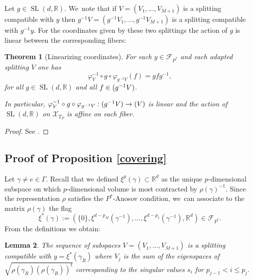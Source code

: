\documentclass[10pt]{amsart}
\newcommand{\NoChangel}[1]{%
\expandafter\let\csname old\string#1\endcsname=#1
\let#1=\relax
\newcommand{#1}{\mathop{\mathcode`l="716C\csname old\string#1\endcsname\mathcode`l="7160}\displaylimits}%
}
\newtheorem{theorem}{Theorem}[section]
\newtheorem{lemma}[theorem]{Lemma}
\newcommand{\R}{\mathbb{R}}
\newcommand{\F}{\mathcal{F}}
\newcommand{\X}{\mathcal{X}}
\let\G\Gamma
\let\g\gamma
\DeclareMathOperator{\nil}{Nil}\NoChangel{\nil}
\DeclareMathOperator{\SL}{SL}
\begin{document}
Let \(g \in \SL (d,\R)\). We~note that if \(V = (V_1,\ldots,V_{M+1})\) is a splitting compatible with \(y\) then \(g^{-1}V = (g^{-1}V_1,\ldots, g^{-1}V_{M+1})\) is a splitting compatible with \(g^{-1}y\).
For the coordinates given by these two splittings the action of \(g\) is linear between the corresponding fibers:

\begin{theorem}[Linearizing coordinates]\label{linearactionlemma}
For each \(y\in \F_{P^\ast} \) and each adapted splitting \(V\) one has
\[
\varphi_{V}^{-1}\circ g \circ \varphi_{g^{-1}V}(f) = g fg^{-1},
\]
for all \(g \in \SL(d,\R)\) and all \(f \in \nil (g^{-1}V)\).

In particular, \(\varphi_{V}^{-1}\circ g\circ \varphi_{g^{-1}V}:\nil(g^{-1}V) \to \nil(V)\) is linear and the action of \(\SL(d,\R) \) on \(\X_{T_P} \) is affine on each fiber.
\end{theorem}
\begin{proof} See \cite[Lem.\,6.2 \& Cor.\,6.3]{LL23}.\end{proof}

\subsection{Proof of Proposition \ref{covering}}
Let \(\g \!\neq\! e\! \in\! \G\). Recall that we defined \hbox{\(\xi^p(\gamma) \!\subset\! \R^d\)} as the unique \(p\)-dimensional subspace on which \(p\)-dimensional volume is most contracted by \(\rho(\gamma)^{-1}\).
Since the representation \(\rho\) satisfies the \(P^\ast\)-Anosov condition, we~can associate to the matrix \(\rho(\g)\) the flag
\[
 \xi^\ast(\g) := (\{0\}, \xi^{d-p_{M}}(\gamma^{-1}),\ldots,\xi^{d-p_1}(\gamma^{-1}), \R^d) \in \F_{P^\ast}.
\]
From the definitions we obtain:
\begin{lemma}\label{canonicalsplitting} The sequence of subspaces \(V = (V_1,\ldots, V_{M+1})\) is a splitting compatible with \(y =\xi^\ast (\g_R) \) where \(V_j\) is the sum of the eigenspaces of \(\sqrt {\rho(\g_R) (\rho(\g_R))^t} \) corresponding to the singular values \(s_i \) for \(p_{j-1} <i \leq p_j\). \end{lemma}
\end{document}
